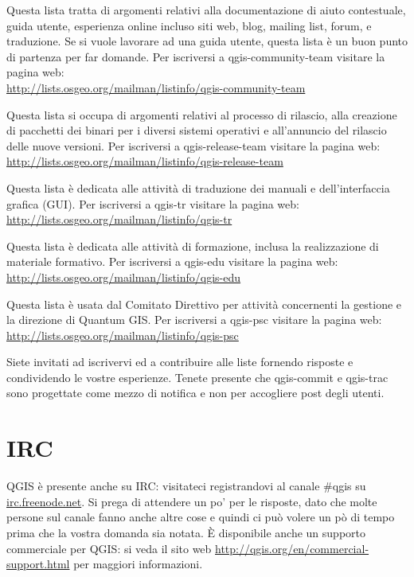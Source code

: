 Questa lista tratta di argomenti relativi alla documentazione di
aiuto contestuale, guida utente, esperienza online incluso siti web, 
blog, mailing list, forum, e traduzione. Se si vuole lavorare ad una guida utente, questa lista è un buon punto di partenza 
per far domande.
Per iscriversi a qgis-community-team visitare la pagina web: \\
\url{http://lists.osgeo.org/mailman/listinfo/qgis-community-team}

Questa lista si occupa di argomenti relativi al processo di rilascio, 
alla creazione di pacchetti dei binari per i diversi sistemi operativi 
e all'annuncio del rilascio delle nuove versioni.
Per iscriversi a qgis-release-team visitare la pagina web: \\
\url{http://lists.osgeo.org/mailman/listinfo/qgis-release-team}

Questa lista è dedicata alle attività di traduzione dei manuali e dell'interfaccia grafica (GUI).
Per iscriversi a qgis-tr visitare la pagina web: \\
\url{http://lists.osgeo.org/mailman/listinfo/qgis-tr}

Questa lista è dedicata alle attività di formazione, inclusa la realizzazione 
di materiale formativo.
Per iscriversi a qgis-edu visitare la pagina web: \\
\url{http://lists.osgeo.org/mailman/listinfo/qgis-edu}

Questa lista è usata dal Comitato Direttivo per attività concernenti 
la gestione e la direzione di Quantum GIS. 
Per iscriversi a qgis-psc visitare la pagina web: \\
\url{http://lists.osgeo.org/mailman/listinfo/qgis-psc}

Siete invitati ad iscrivervi ed a contribuire 
alle liste fornendo risposte e condividendo le vostre esperienze. Tenete 
presente che qgis-commit e qgis-trac sono progettate come mezzo di notifica 
e non per accogliere post degli utenti. 

\section{IRC}
QGIS è presente anche su IRC: visitateci registrandovi al canale \#qgis su
\url{irc.freenode.net}. Si prega di attendere un po' per le risposte, dato 
che molte persone sul canale fanno anche altre cose e quindi ci può volere 
un pò di tempo prima che la vostra domanda sia notata.
È disponibile anche un supporto commerciale per QGIS: si veda il sito web 
\url{http://qgis.org/en/commercial-support.html} per maggiori informazioni.

